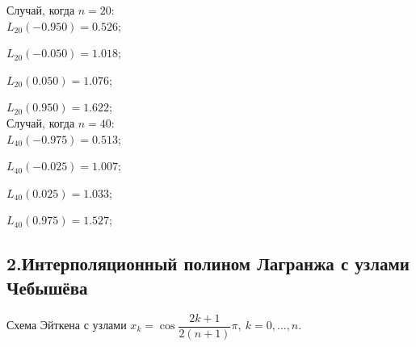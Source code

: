 \documentclass[11pt, russian]{article}
\begin{document}
    
    Случай, когда $n=20$:\\

    
    

    
    $L_{20}(-0.950)=0.526$;

    
    $L_{20}(-0.050)=1.018$;

    
    $L_{20}(0.050)=1.076$;

    
    $L_{20}(0.950)=1.622$;\\

    
    

    
    Случай, когда $n=40$:\\

    
    

    
    $L_{40}(-0.975)=0.513$;

    
    $L_{40}(-0.025)=1.007$;

    
    $L_{40}(0.025)=1.033$;

    
    $L_{40}(0.975)=1.527$;\\

    
    

    
    \hypertarget{ux438ux43dux442ux435ux440ux43fux43eux43bux44fux446ux438ux43eux43dux43dux44bux439-ux43fux43eux43bux438ux43dux43eux43c-ux43bux430ux433ux440ux430ux43dux436ux430-ux441-ux443ux437ux43bux430ux43cux438-ux447ux435ux431ux44bux448ux451ux432ux430}{%
\subsection*{2.Интерполяционный полином Лагранжа с узлами
Чебышёва}\label{ux438ux43dux442ux435ux440ux43fux43eux43bux44fux446ux438ux43eux43dux43dux44bux439-ux43fux43eux43bux438ux43dux43eux43c-ux43bux430ux433ux440ux430ux43dux436ux430-ux441-ux443ux437ux43bux430ux43cux438-ux447ux435ux431ux44bux448ux451ux432ux430}}

Схема Эйткена с узлами
\(x_k=\cos\dfrac{2k+1}{2(n+1)}\pi,\:k=0,\ldots,n.\)
\end{document}
